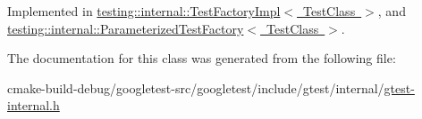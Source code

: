 Implemented in \mbox{\hyperlink{classtesting_1_1internal_1_1TestFactoryImpl_a8860c89bdb06450a5d5e8137ebd9d775}{testing\+::internal\+::\+Test\+Factory\+Impl$<$ Test\+Class $>$}}, and \mbox{\hyperlink{classtesting_1_1internal_1_1ParameterizedTestFactory_ae17e73e91f7fd5d49ca238c005ef4960}{testing\+::internal\+::\+Parameterized\+Test\+Factory$<$ Test\+Class $>$}}.



The documentation for this class was generated from the following file\+:\begin{DoxyCompactItemize}
\item 
cmake-\/build-\/debug/googletest-\/src/googletest/include/gtest/internal/\mbox{\hyperlink{gtest-internal_8h}{gtest-\/internal.\+h}}\end{DoxyCompactItemize}
